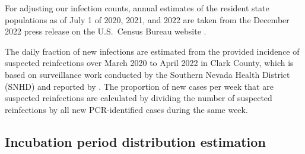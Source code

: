 \documentclass{article}
\begin{document}
For adjusting our infection counts, annual estimates of the resident state
populations as of July 1 of 2020, 2021, and 2022 are taken from the December
2022 press release on the U.S.\ Census Bureau website \citep{uscensus2022annual}.

The daily fraction of new infections are estimated from the provided incidence
of suspected reinfections over March 2020 to April 2022 in Clark County, which
is based on surveillance work conducted by the Southern Nevada Health District
(SNHD) and reported by \citet{ruff2022rapid}. The proportion of new cases per
week that are suspected reinfections are calculated by dividing the number of
suspected reinfections by all new PCR-identified cases during the same week. 


\subsection{Incubation period distribution estimation} 
\end{document}
